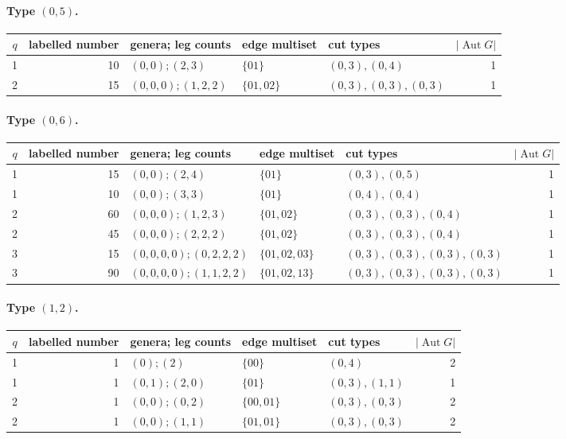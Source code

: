 \paragraph{Type $(0,5)$.}
\begin{longtable}{c|r|l|l|l|r}
$q$ & labelled number & genera; leg counts & edge multiset & cut types & $|\operatorname{Aut}G|$\\\hline
1 & 10 & $(0,0);(2,3)$ & $\{01\}$ & $(0,3),(0,4)$ & 1\\
2 & 15 & $(0,0,0);(1,2,2)$ & $\{01,02\}$ & $(0,3),(0,3),(0,3)$ & 1\\
\end{longtable}
\paragraph{Type $(0,6)$.}
\begin{longtable}{c|r|l|l|l|r}
$q$ & labelled number & genera; leg counts & edge multiset & cut types & $|\operatorname{Aut}G|$\\\hline
1 & 15 & $(0,0);(2,4)$ & $\{01\}$ & $(0,3),(0,5)$ & 1\\
1 & 10 & $(0,0);(3,3)$ & $\{01\}$ & $(0,4),(0,4)$ & 1\\
2 & 60 & $(0,0,0);(1,2,3)$ & $\{01,02\}$ & $(0,3),(0,3),(0,4)$ & 1\\
2 & 45 & $(0,0,0);(2,2,2)$ & $\{01,02\}$ & $(0,3),(0,3),(0,4)$ & 1\\
3 & 15 & $(0,0,0,0);(0,2,2,2)$ & $\{01,02,03\}$ & $(0,3),(0,3),(0,3),(0,3)$ & 1\\
3 & 90 & $(0,0,0,0);(1,1,2,2)$ & $\{01,02,13\}$ & $(0,3),(0,3),(0,3),(0,3)$ & 1\\
\end{longtable}
\paragraph{Type $(1,2)$.}
\begin{longtable}{c|r|l|l|l|r}
$q$ & labelled number & genera; leg counts & edge multiset & cut types & $|\operatorname{Aut}G|$\\\hline
1 & 1 & $(0);(2)$ & $\{00\}$ & $(0,4)$ & 2\\
1 & 1 & $(0,1);(2,0)$ & $\{01\}$ & $(0,3),(1,1)$ & 1\\
2 & 1 & $(0,0);(0,2)$ & $\{00,01\}$ & $(0,3),(0,3)$ & 2\\
2 & 1 & $(0,0);(1,1)$ & $\{01,01\}$ & $(0,3),(0,3)$ & 2\\
\end{longtable}
